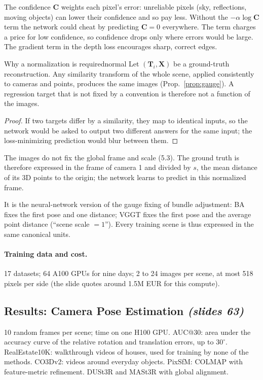 \documentclass[11pt,a4paper]{article}
\newcommand{\slr}[1]{\texorpdfstring{\emph{(slides #1)}}{(slides #1)}}
\begin{document}
\begin{intuition}
The confidence $\bm C$ weights each pixel's error: unreliable pixels (sky, reflections, moving objects) can lower their confidence and so pay less. Without the $-\alpha\log\bm C$ term the network could cheat by predicting $\bm C=0$ everywhere. The term charges a price for low confidence, so confidence drops only where errors would be large. The gradient term in the depth loss encourages sharp, correct edges.
\end{intuition}

\begin{proposition}{Why a normalization is required}{normal}
Let $(\bm T_i,\bm X)$ be a ground-truth reconstruction. Any similarity transform of the whole scene, applied consistently to cameras and points, produces the same images (Prop.~\ref{prop:gauge}). A regression target that is not fixed by a convention is therefore not a function of the images.
\end{proposition}
\begin{proof}
If two targets differ by a similarity, they map to identical inputs, so the network would be asked to output two different answers for the same input; the loss-minimizing prediction would blur between them.
\end{proof}

The images do not fix the global frame and scale (5.3). The ground truth is therefore expressed in the frame of camera 1 and divided by $s$, the mean distance of its 3D points to the origin; the network learns to predict in this normalized frame.

\begin{intuition}
It is the neural-network version of the gauge fixing of bundle adjustment: BA fixes the first pose and one distance; VGGT fixes the first pose and the average point distance (``scene scale $=1$''). Every training scene is thus expressed in the same canonical units.
\end{intuition}

\paragraph{Training data and cost.} 17 datasets; 64 A100 GPUs for nine days; 2 to 24 images per scene, at most 518 pixels per side (the slide quotes around 1.5M EUR for this compute).

\subsection{Results: Camera Pose Estimation \slr{63}}
10 random frames per scene; time on one H100 GPU. AUC@30: area under the accuracy curve of the relative rotation and translation errors, up to $30^\circ$. RealEstate10K: walkthrough videos of houses, used for training by none of the methods. CO3Dv2: videos around everyday objects. PixSfM: COLMAP with feature-metric refinement. DUSt3R and MASt3R with global alignment.
\end{document}
